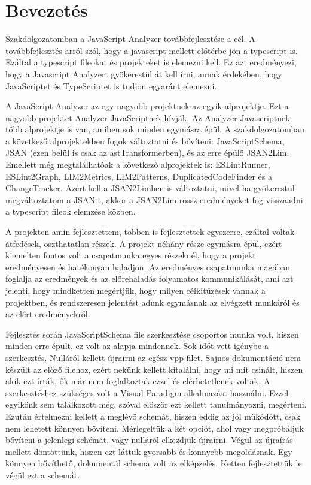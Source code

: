 \chapter*{Bevezetés}

\noindent

Szakdolgozatomban a JavaScript Analyzer továbbfejlesztése a cél.
A továbbfejlesztés arról szól, hogy a javascript mellett előtérbe jön a typescript is.
Ezáltal a typescript fileokat és projekteket is elemezni kell.
Ez azt eredményezi, hogy a Javascript Analyzert gyökerestül át kell írni, annak érdekében,
hogy JavaScriptet és TypeScriptet is tudjon egyaránt elemezni.

\noindent

A JavaScript Analyzer az egy nagyobb projektnek az egyik alprojektje. Ezt a nagyobb projektet Analyzer-JavaScriptnek hívják.
Az Analyzer-Javascriptnek több alprojektje is van, amiben sok minden egymásra épül.
A szakdolgozatomban a következő alprojektekben fogok változtatni és bővíteni: JavaScriptSchema, JSAN (ezen belül is csak az astTransformerben), és az erre épülő JSAN2Lim.
Emellett még megtalálhatóak a következő alprojektek is: ESLintRunner, ESLint2Graph, LIM2Metrics, LIM2Patterns, DuplicatedCodeFinder és a ChangeTracker.
Azért kell a JSAN2Limben is változtatni, mivel ha gyökerestül megváltoztatom a JSAN-t,
akkor a JSAN2Lim rossz eredményeket fog visszaadni a typescript fileok elemzése közben.

\noindent

A projekten amin fejlesztettem, többen is fejlesztettek egyszerre, ezáltal voltak átfedések, oszthatatlan részek.
A projekt néhány része egymásra épül, ezért kiemelten fontos volt a csapatmunka egyes részeknél, hogy a projekt eredményesen és hatékonyan haladjon.
Az eredményes csapatmunka magában foglalja az eredmények és az előrehaladás folyamatos kommunikálását,
ami azt jelenti, hogy mindketten megértjük, hogy milyen célkitűzések vannak a projektben,
és rendszeresen jelentést adunk egymásnak az elvégzett munkáról és az elért eredményekről.

\noindent

Fejlesztés során JavaScriptSchema file szerkesztése csoportos munka volt, hiszen minden erre épült, ez volt az alapja mindennek.
Sok időt vett igénybe a szerkesztés. Nulláról kellett újraírni az egész vpp filet.
Sajnos dokumentáció nem készült az előző filehoz, ezért nekünk kellett kitalálni, hogy mi mit csinált, hiszen akik ezt írták, ők már nem foglalkoztak ezzel és elérhetetlenek voltak.
A szerkesztéshez szükséges volt a Visual Paradigm alkalmazást használni.
Ezzel egyikőnk sem találkozott még, szóval először ezt kellett tanulmányozni, megérteni.
Ezután értelmezni kellett a meglévő schemát, hiszen eddig az jól működött, csak nem lehetett könnyen bővíteni.
Mérlegeltük a két opciót, ahol vagy megpróbáljuk bővíteni a jelenlegi schémát, vagy nulláról elkezdjük újraírni.
Végül az újraírás mellett döntöttünk, hiszen ezt láttuk gyorsabb és könnyebb megoldásnak. Egy könnyen bővíthető, dokumentál schema volt az elképzelés.
Ketten fejlesztettük le végül ezt a schemát.

